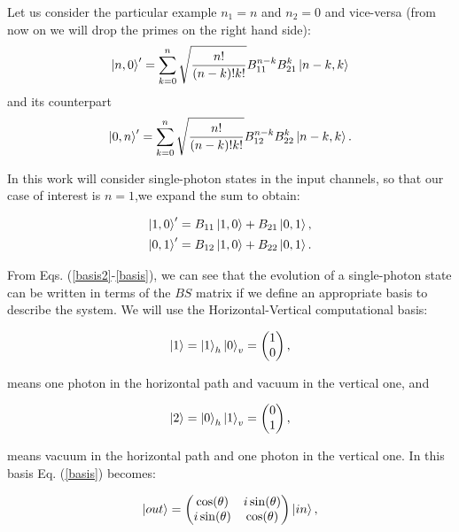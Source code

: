 \documentclass[12pt]{book}
\begin{document}
Let us consider the particular example  $n_{1}=n$ and $n_{2}=0$  and vice-versa (from now on we will drop the primes on the right hand side):
\begin{equation}
 \ket{n,0}'=\sum^{n}_{k=0} \sqrt{\frac{n!}{(n-k)!k!}} B_{11}^{n-k} B_{21}^{k} \ket{n-k,k}
\end{equation}
and its counterpart
\begin{equation}
     \ket{0,n}'=\sum^{n}_{k=0} \sqrt{\frac{n!}{(n-k)!k!}} B_{12}^{n-k} B_{22}^{k} \ket{n-k,k}.
\end{equation}

In this work will consider single-photon states in the input channels, so that our case of interest is $n=1$,we expand the sum to obtain:

\begin{align}
\ket{1,0}'=B_{11}\ket{1,0}+B_{21}\ket{0,1},\label{basis2} \\
\ket{0,1}'=B_{12}\ket{1,0}+B_{22}\ket{0,1}.
\label{basis}
\end{align}


From Eqs. (\ref{basis2}-\ref{basis}), we can see that the evolution of a single-photon state can be written in terms of the $BS$ matrix if we define an appropriate basis to describe the system. We will use the Horizontal-Vertical computational basis:

 \begin{equation}
 \ket{1}=\ket{1}_{h}\ket{0}_{v}=\begin{pmatrix} 1 \\0\end{pmatrix},
 \end{equation}

 means one photon in the horizontal path and vacuum in the vertical one, and
 
 \begin{equation}
 \ket{2}=\ket{0}_{h}\ket{1}_{v}=\begin{pmatrix} 0 \\1 \end{pmatrix},
 \end{equation}
 
means vacuum  in the horizontal path and one photon in the vertical one. In this basis Eq. (\ref{basis}) becomes:

\begin{equation}
\ket{out}=\begin{pmatrix} \cos(\theta) & i \sin(\theta) \\ i \sin(\theta) & \cos(\theta) \end{pmatrix} \ket{in},
\end{equation}
\end{document}
